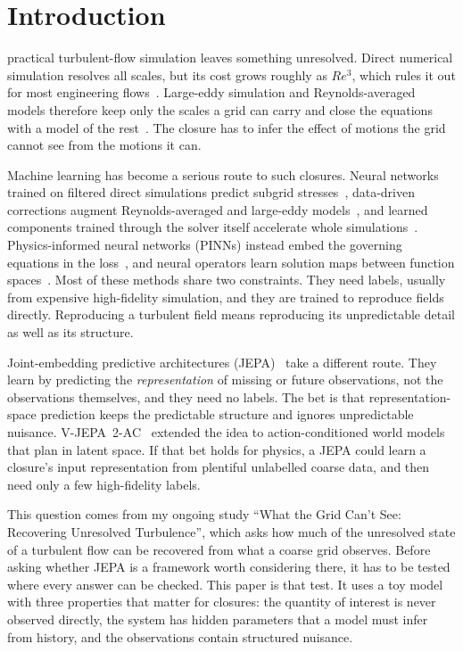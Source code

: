 \documentclass[10pt,journal]{IEEEtran}
\begin{document}
\section{Introduction}
 practical turbulent-flow simulation leaves something unresolved. Direct numerical simulation resolves all scales, but its cost grows roughly as $Re^{3}$, which rules it out for most engineering flows~\cite{pope2000turbulent}. Large-eddy simulation and Reynolds-averaged models therefore keep only the scales a grid can carry and close the equations with a model of the rest~\cite{pope2000turbulent,schiestel2008modeling}. The closure has to infer the effect of motions the grid cannot see from the motions it can.

Machine learning has become a serious route to such closures. Neural networks trained on filtered direct simulations predict subgrid stresses~\cite{beck2019les,maulik2019subgrid}, data-driven corrections augment Reynolds-averaged and large-eddy models~\cite{duraisamy2019turbulence,duraisamy2021perspectives,brunton2020mlfluids}, and learned components trained through the solver itself accelerate whole simulations~\cite{kochkov2021mlcfd}. Physics-informed neural networks (PINNs) instead embed the governing equations in the loss~\cite{raissi2017pinn}, and neural operators learn solution maps between function spaces~\cite{li2021fno,lu2021deeponet}. Most of these methods share two constraints. They need labels, usually from expensive high-fidelity simulation, and they are trained to reproduce fields directly. Reproducing a turbulent field means reproducing its unpredictable detail as well as its structure.

Joint-embedding predictive architectures (JEPA)~\cite{assran2023ijepa,bardes2024vjepa} take a different route. They learn by predicting the \emph{representation} of missing or future observations, not the observations themselves, and they need no labels. The bet is that representation-space prediction keeps the predictable structure and ignores unpredictable nuisance. V-JEPA~2-AC~\cite{assran2025vjepa2} extended the idea to action-conditioned world models that plan in latent space. If that bet holds for physics, a JEPA could learn a closure's input representation from plentiful unlabelled coarse data, and then need only a few high-fidelity labels.

This question comes from my ongoing study ``What the Grid Can't See: Recovering Unresolved Turbulence'', which asks how much of the unresolved state of a turbulent flow can be recovered from what a coarse grid observes. Before asking whether JEPA is a framework worth considering there, it has to be tested where every answer can be checked. This paper is that test. It uses a toy model with three properties that matter for closures: the quantity of interest is never observed directly, the system has hidden parameters that a model must infer from history, and the observations contain structured nuisance.
\end{document}

